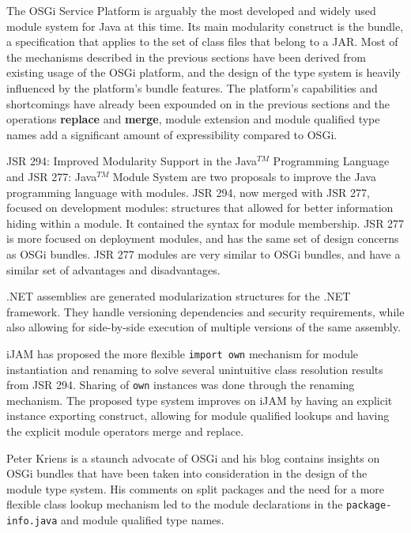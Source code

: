 The OSGi Service Platform \cite{OSGi4} is arguably the most developed and
widely used module system for Java at this time. Its main modularity 
construct is the bundle, a specification that applies to the set of class
files that belong to a JAR. Most of the mechanisms
described in the previous sections have been derived from existing usage
of the OSGi platform, and the design of the type system is heavily
influenced by the platform's bundle features. The platform's
capabilities and shortcomings have already been expounded on in the 
previous sections and the operations \textbf{replace} and \textbf{merge},
module extension and module qualified type names add a significant amount of expressibility compared
to OSGi.

JSR 294: Improved Modularity Support in the Java$^{TM}$ Programming Language \cite{JSR294} and
JSR 277: Java$^{TM}$ Module System \cite{JSR277} are two proposals to improve
the Java programming language with modules. JSR 294, now merged with JSR 277, focused
on development modules: structures that allowed for better information hiding within 
a module. It contained the syntax for module membership.
JSR 277 is more focused on deployment modules, and has the same set of design 
concerns as OSGi bundles. JSR 277 modules are very similar to OSGi bundles,
and have a similar set of advantages and disadvantages.

.NET assemblies \cite{netassemblies} are generated modularization structures
for the .NET framework. They handle versioning dependencies and security
requirements, while also allowing for side-by-side execution of multiple
versions of the same assembly.

iJAM \cite{iJAM} has proposed the more flexible \texttt{import own}
mechanism for module instantiation and renaming to solve several unintuitive class
resolution results from JSR 294. Sharing of \texttt{own} instances was
done through the renaming mechanism. The proposed type system improves
on iJAM by having an explicit instance exporting construct,
allowing for module qualified lookups and having the explicit module operators
merge and replace.

Peter Kriens is a staunch advocate of OSGi and his blog \cite{iJAMComments, superpackagesNoMore}
contains insights on OSGi bundles that have been taken into consideration
in the design of the module type system. His comments on split packages and
the need for a more flexible class lookup mechanism led to the module declarations
in the \texttt{package-info.java} and module qualified type names.

